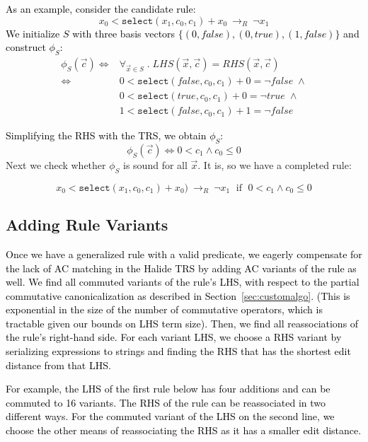 \documentclass[acmsmall,review]{acmart}\settopmatter{printfolios=true,printccs=false,printacmref=false}
\newcommand{\modified}[1]{\textcolor{black}{{#1}}}
\newcommand{\rewrites}[0]{\:\rightarrow_{R}\:}
\newcommand{\pred}[0]{\textrm{ if }}
\newcommand{\hsel}[0]{\texttt{select}}
\begin{document}
\modified{As an example, consider the candidate rule:}
%
\[ x_0 < \hsel(x_1, c_0, c_1) + x_0 \rewrites \neg x_1
\]
\modified{We initialize $S$ with three basis vectors $\{(0,\mathit{false}), (0,\mathit{true}), (1,\mathit{false})\}$ and construct $\phi_S$:}
%
\begin{equation*}
\begin{split}
 \phi_S(\vec{c}) \iff 
 &  \forall_{\vec{x} \in S} \;.\; LHS(\vec{x},\vec{c}) = RHS(\vec{x},\vec{c}) \\
 \iff & 
 0 < \hsel(\mathit{false}, c_0, c_1) + 0 = \neg\mathit{false} \; \wedge \\
                                                   & 0 < \hsel(\mathit{true}, c_0, c_1) + 0 = \neg \mathit{true}  \; \wedge \\
                                                   & 1 < \hsel(\mathit{false}, c_0, c_1) + 1 = \neg\mathit{false}
\end{split}
\end{equation*}

\modified{Simplifying the RHS with the TRS, we obtain $\phi_S$: }
%
\[  \phi_S(\vec{c}) \iff 0 < c_1 \wedge c_0 \le 0
\]
Next we check whether $\phi_S$ is sound for all $\vec{x}$.  It is, so we have a completed rule:

\[ x_0 < \hsel(x_1, c_0, c_1) + x_0) \rewrites \neg x_1 \;\pred \;0 < c_1 \wedge c_0 \le 0
\]


\subsection{Adding Rule Variants}
\label{sec:rulevariants}
\modified{Once we have a generalized rule with a valid predicate, we eagerly compensate for the lack
of AC matching in the Halide TRS by adding AC variants of the rule as well. We find 
all commuted variants of the rule's LHS,
with respect to the partial commutative canonicalization as described in Section~\ref{sec:customalgo}.
 (This is exponential in the size of the number 
of commutative operators, which is tractable given our bounds on LHS term size). 
Then, we find all reassociations of the rule's right-hand side. For each variant LHS, 
we choose a RHS variant by serializing expressions to strings and finding the RHS 
that has the shortest edit distance from that LHS. }

\modified{For example, the LHS of the first rule below has four additions and can be commuted 
to 16 variants. The RHS of the rule can be reassociated in two different ways. For the 
commuted variant of the LHS on the second line, we choose the other means of reassociating
the RHS as it has a smaller edit distance.}
\end{document}
